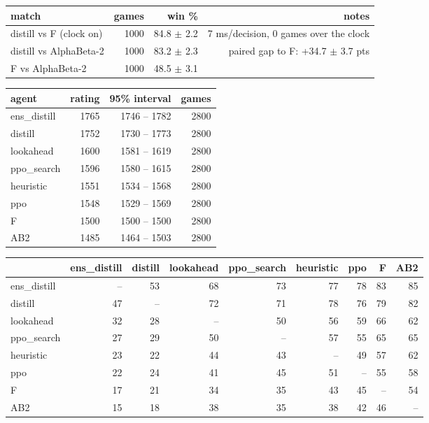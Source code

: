 \begin{tabular}{lrrr}
\toprule
match & games & win \% & notes \\
\midrule
distill vs F (clock on) & 1000 & 84.8 $\pm$ 2.2 & 7 ms/decision, 0 games over the clock \\
distill vs AlphaBeta-2 & 1000 & 83.2 $\pm$ 2.3 & paired gap to F: +34.7 $\pm$ 3.7 pts \\
F vs AlphaBeta-2 & 1000 & 48.5 $\pm$ 3.1 &  \\
\bottomrule
\end{tabular}

\begin{tabular}{lrrr}
\toprule
agent & rating & 95\% interval & games \\
\midrule
ens\_distill & 1765 & 1746 -- 1782 & 2800 \\
distill & 1752 & 1730 -- 1773 & 2800 \\
lookahead & 1600 & 1581 -- 1619 & 2800 \\
ppo\_search & 1596 & 1580 -- 1615 & 2800 \\
heuristic & 1551 & 1534 -- 1568 & 2800 \\
ppo & 1548 & 1529 -- 1569 & 2800 \\
F & 1500 & 1500 -- 1500 & 2800 \\
AB2 & 1485 & 1464 -- 1503 & 2800 \\
\bottomrule
\end{tabular}

\begin{tabular}{lrrrrrrrr}
\toprule
 & ens\_distill & distill & lookahead & ppo\_search & heuristic & ppo & F & AB2 \\
\midrule
ens\_distill & -- & 53 & 68 & 73 & 77 & 78 & 83 & 85 \\
distill & 47 & -- & 72 & 71 & 78 & 76 & 79 & 82 \\
lookahead & 32 & 28 & -- & 50 & 56 & 59 & 66 & 62 \\
ppo\_search & 27 & 29 & 50 & -- & 57 & 55 & 65 & 65 \\
heuristic & 23 & 22 & 44 & 43 & -- & 49 & 57 & 62 \\
ppo & 22 & 24 & 41 & 45 & 51 & -- & 55 & 58 \\
F & 17 & 21 & 34 & 35 & 43 & 45 & -- & 54 \\
AB2 & 15 & 18 & 38 & 35 & 38 & 42 & 46 & -- \\
\bottomrule
\end{tabular}


